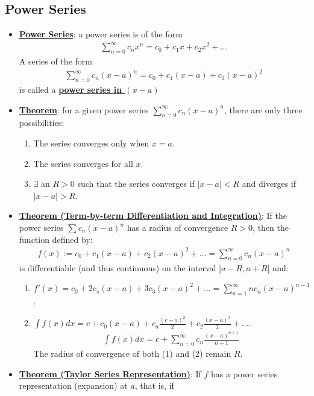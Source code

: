 \documentclass[reqno,11pt]{amsart}
\theoremstyle{definition}
\theoremstyle{remark}
\newcommand{\dfn}[1]{\underline{\textbf{#1}}}
\begin{document}
\subsection{Power Series}
\begin{itemize}[noitemsep]
	\item \dfn{Power Series}: a power series is of the form 
	\begin{align}
		\sum_{n=0}^\infty c_n x^n = c_0 + c_1 x + c_2 x^2 + ... 	
	\end{align}
	A series of the form 
	\begin{align}
		\sum_{n=0}^\infty c_n (x-a)^n = c_0 + c_1 (x-a) + c_2 (x-a)^2 
	\end{align}
	is called a \dfn{power series in $(x-a)$}
	\item \dfn{Theorem}: for a given power series $\sum_{n=0}^\infty c_n (x-a)^n$, there are only three possibilities: 
	\begin{enumerate}[noitemsep]
		\item The series converges only when $x=a$. 
		\item The series converges for all $x$. 
		\item $\exists$ an $R>0$ such that the series converges if $|x-a| < R$ and diverges if $|x-a| > R$. 
	\end{enumerate}
	\item \dfn{Theorem (Term-by-term Differentiation and Integration)}: If the power series $\sum c_n (x-a)^n$ has a radius of convergence $R>0$, then the function defined by: 
	\begin{align}
		f(x) := c_0 + c_1 (x-a) + c_2 (x-a)^2 + ... = \sum_{n=0}^\infty c_n (x-a)^n 	
	\end{align}
	is differentiable (and thus continuous) on the interval $]a-R, a+R[$ and:
	\begin{enumerate}[noitemsep]
		\item $f'(x) = c_0 + 2c_s(x-a) + 3c_3 (x-a)^2 + ... = \sum_{n=1}^\infty nc_n (x-a)^{n-1}$. 
		\item $\int f(x) dx = c + c_0 (x-a) + c_a \frac{(c-a)^2}{2} + c_2 \frac{(x-a)^3}{3} + .... $
		\begin{align}
			\int f(x) dx = c + \sum_{n=0}^\infty c_n \frac{(x-a)^{n+1}}{n+1}	
		\end{align}
	The radius of convergence of both (1) and (2) remain $R$. 
	\end{enumerate}
	\item \dfn{Theorem (Taylor Series Representation)}: If $f$ has a power series representation (expansion) at $a$, that is, if 

\end{itemize}
\end{document}
